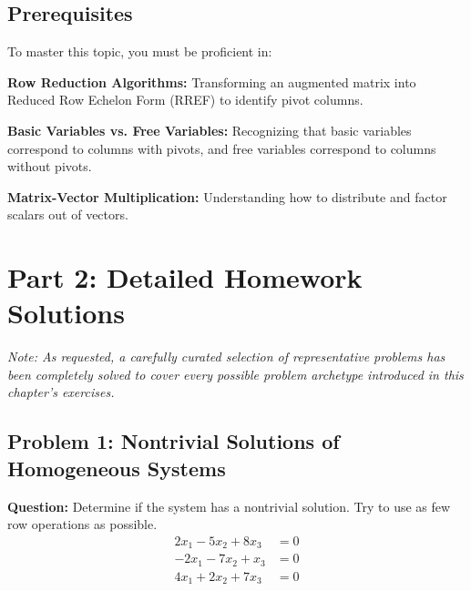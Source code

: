 \documentclass[11pt]{article}
\begin{document}
\subsection{Prerequisites}
To master this topic, you must be proficient in:
\item \textbf{Row Reduction Algorithms:} Transforming an augmented matrix into Reduced Row Echelon Form (RREF) to identify pivot columns.
\item \textbf{Basic Variables vs. Free Variables:} Recognizing that basic variables correspond to columns with pivots, and free variables correspond to columns without pivots.
\item \textbf{Matrix-Vector Multiplication:} Understanding how to distribute and factor scalars out of vectors.

\newpage
\section{Part 2: Detailed Homework Solutions}

\textit{Note: As requested, a carefully curated selection of representative problems has been completely solved to cover every possible problem archetype introduced in this chapter's exercises.}

\subsection*{Problem 1: Nontrivial Solutions of Homogeneous Systems}
\textbf{Question:} Determine if the system has a nontrivial solution. Try to use as few row operations as possible.
\begin{align*}
    2x_1 - 5x_2 + 8x_3 &= 0 \\
    -2x_1 - 7x_2 + x_3 &= 0 \\
    4x_1 + 2x_2 + 7x_3 &= 0
\end{align*}
\end{document}
